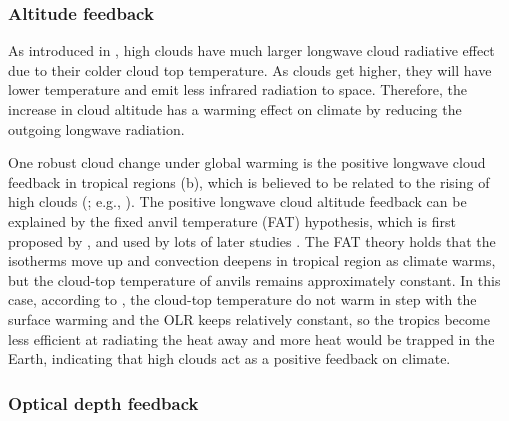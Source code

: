 
\subsubsection{Altitude feedback}

As introduced in , high clouds have much larger longwave cloud radiative effect due to their colder cloud top temperature. As clouds get higher, they will have lower temperature and emit less infrared radiation to space. Therefore, the increase in cloud altitude has a warming effect on climate by reducing the outgoing longwave radiation. 

One robust cloud change under global warming is the positive longwave cloud feedback in tropical regions (b), which is believed to be related to the rising of high clouds (; e.g., \citealt{Wetherald1988cloud}).  
The positive longwave cloud altitude feedback can be explained by the fixed anvil temperature (FAT) hypothesis, which is first proposed by \cite{Hartmann2002FAT}, and used by lots of later studies \cite[e.g.,][]{Kuang2007,Zelinka2010longwave,Yoshimori2020fixed}. The FAT theory holds that the isotherms move up and convection deepens in tropical region as climate warms, but the cloud-top temperature of anvils remains approximately constant. In this case, according to , the cloud-top temperature do not warm in step with the surface warming and the OLR keeps relatively constant, so the tropics become less efficient at radiating the heat away and more heat would be trapped in the Earth, indicating that high clouds act as a positive feedback on climate.

\subsubsection{Optical depth feedback}

